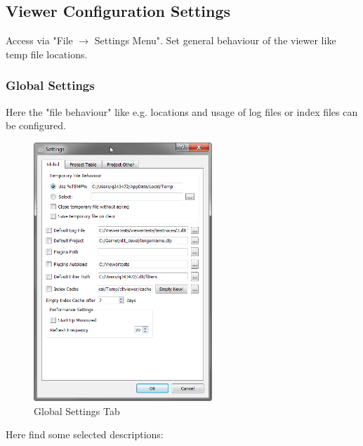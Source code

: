 \documentclass[a4paper,11pt]{article}
\begin{document}

\pagebreak
\subsection{Viewer Configuration Settings}
Access via "File \ensuremath{\rightarrow} Settings Menu".
\linebreak
Set general behaviour of the viewer like temp file locations.

\nopagebreak


\subsubsection{Global Settings}
\label{globalsettings}
Here the "file behaviour" like e.g. locations and usage of log files or index files can be configured.

\begin{figure}[H]
 \centering
 \includegraphics[width=0.6\textwidth]{images/settings_global.png}
 \caption{Global Settings Tab}
 \label{fig:globalsettingstab}
\end{figure}


Here find some selected descriptions:
\end{document}
